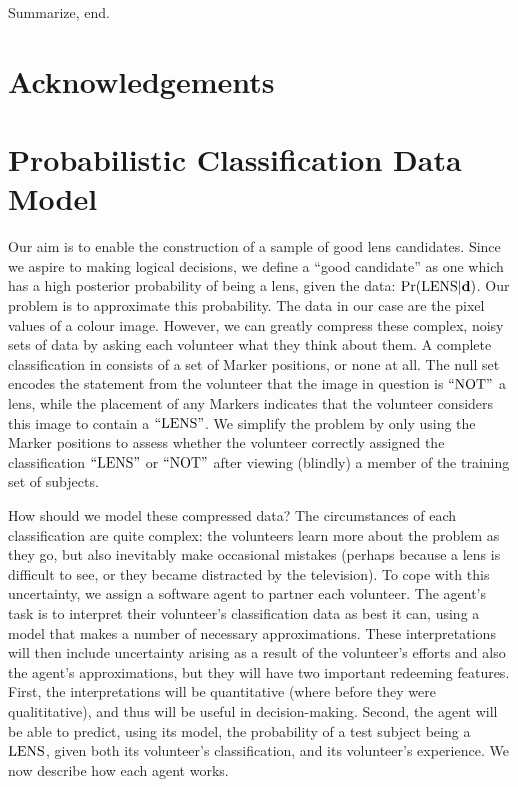 \documentclass[useAMS,usenatbib,a4paper]{mn2e}
\begin{document}
Summarize, end.


\section*{Acknowledgements}
 



\appendix


\section{Probabilistic Classification Data Model}
\label{appendix:probmodel}

Our aim is to enable the construction of a sample of good lens candidates.
Since we aspire to making logical  decisions, we define a  ``good candidate''
as one which has a high posterior probability of being a lens, given the data:
${\rm Pr}({\rm LENS}|{\mathbf{d}})$. Our problem is to approximate this probability. The data
in our case are the pixel values of a colour image. However, we can greatly
compress these complex, noisy sets of data by asking each volunteer what they
think about them. A complete  classification in \sw consists of a set of
Marker positions, or none at all. The null set encodes the statement from
the volunteer that the image in question is ${\rm ``NOT"}$ a lens, while the
placement of any  Markers indicates that the volunteer considers this image to
contain a ${\rm ``LENS"}$.  We simplify the problem by only using the Marker
positions to assess whether the volunteer  correctly assigned the
classification ${\rm ``LENS"}$ or ${\rm ``NOT"}$ after viewing (blindly) a member of
the training set of subjects. 

How should we model these compressed data? The circumstances of each
classification are quite complex: the volunteers learn more about the problem
as they go, but also inevitably make occasional mistakes (perhaps because a
lens is difficult to see, or they became distracted by the television). To
cope with this uncertainty, we assign a software agent to partner each
volunteer. The agent's task is to interpret their volunteer's classification
data as best it can, using a model that makes a number of necessary
approximations. These interpretations will then include uncertainty arising as
a result of the volunteer's efforts and also the agent's approximations, but
they will have two important redeeming features. First, the interpretations
will be quantitative (where before they were qualititative),  and thus will be
useful in decision-making. Second, the agent will be able to predict, using
its model, the probability of a test subject being a ${\rm LENS}$, given both its
volunteer's classification, and its volunteer's experience. We now
describe how each agent works.
\end{document}
